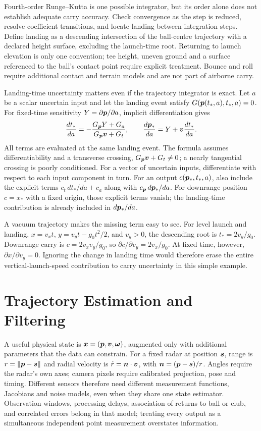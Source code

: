 Fourth-order Runge--Kutta is one possible integrator, but its order alone does not establish adequate carry accuracy.
Check convergence as the step is reduced, resolve coefficient transitions, and locate landing between integration steps.
Define landing as a descending intersection of the ball-centre trajectory with a declared height surface, excluding the launch-time root.
Returning to launch elevation is only one convention; tee height, uneven ground and a surface referenced to the ball's contact point require explicit treatment.
Bounce and roll require additional contact and terrain models and are not part of airborne carry.

Landing-time uncertainty matters even if the trajectory integrator is exact.
Let $a$ be a scalar uncertain input and let the landing event satisfy $G(\bm{p}(t_*,a),t_*,a)=0$.
For fixed-time sensitivity $Y=\partial\bm{p}/\partial a$, implicit differentiation gives
\begin{equation}
\label{eq:landingderivative}
\frac{dt_*}{da}=-\frac{G_{\bm{p}}Y+G_a}{G_{\bm{p}}\bm{v}+G_t},\qquad
\frac{d\bm{p}_*}{da}=Y+\bm{v}\frac{dt_*}{da}.
\end{equation}
All terms are evaluated at the same landing event.
The formula assumes differentiability and a transverse crossing, $G_{\bm{p}}\bm{v}+G_t\ne0$; a nearly tangential crossing is poorly conditioned.
For a vector of uncertain inputs, differentiate with respect to each input component in turn.
For an output $c(\bm{p}_*,t_*,a)$, also include the explicit terms $c_t\,dt_*/da+c_a$ along with $c_{\bm{p}}\,d\bm{p}_*/da$.
For downrange position $c=x_*$ with a fixed origin, those explicit terms vanish; the landing-time contribution is already included in $d\bm{p}_*/da$.

A vacuum trajectory makes the missing term easy to see.
For level launch and landing, $x=v_x t$, $y=v_y t-g_0t^2/2$, and $v_y>0$, the descending root is $t_*=2v_y/g_0$.
Downrange carry is $c=2v_xv_y/g_0$, so $\partial c/\partial v_y=2v_x/g_0$.
At fixed time, however, $\partial x/\partial v_y=0$.
Ignoring the change in landing time would therefore erase the entire vertical-launch-speed contribution to carry uncertainty in this simple example.

\section{Trajectory Estimation and Filtering}
\label{sec:ekf}

A useful physical state is $\bm{x}=(\bm{p},\bm{v},\bm{\omega})$, augmented only with additional parameters that the data can constrain.
For a fixed radar at position $\bm{s}$, range is $r=\lVert\bm{p}-\bm{s}\rVert$ and radial velocity is $\dot r=\bm{n}\cdot\bm{v}$, with $\bm{n}=(\bm{p}-\bm{s})/r$.
Angles require the radar's own axes; camera pixels require calibrated projection, pose and timing.
Different sensors therefore need different measurement functions, Jacobians and noise models, even when they share one state estimator.
Observation windows, processing delays, association of returns to ball or club, and correlated errors belong in that model; treating every output as a simultaneous independent point measurement overstates information.

